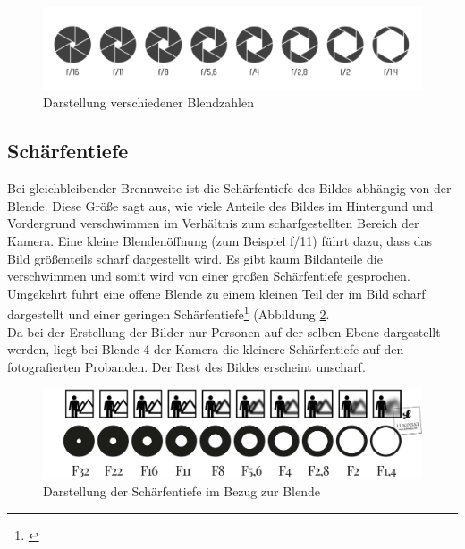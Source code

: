 \begin{figure}[htp]     %
\centering
\includegraphics[width=1.0\textwidth]{bilder/blende} 
\caption {Darstellung verschiedener Blendzahlen\protect\footnotemark}\label{b_blende}
\end{figure}


\subsection{Schärfentiefe}
\label{sec_scharf}
Bei gleichbleibender Brennweite ist die Schärfentiefe des Bildes abhängig von der Blende. Diese Größe sagt aus, wie viele Anteile des Bildes im Hintergund und Vordergrund verschwimmen im Verhältnis zum scharfgestellten Bereich der Kamera. Eine kleine Blendenöffnung (zum Beispiel f/11) führt dazu, dass das Bild größenteils scharf dargestellt wird. Es gibt kaum Bildanteile die verschwimmen und somit wird von einer großen Schärfentiefe gesprochen. Umgekehrt führt eine offene Blende zu einem kleinen Teil der im Bild scharf dargestellt und einer geringen Schärfentiefe\footnote{\cite[389]{schmidt}} (Abbildung \ref{b_scharfentiefe}.\\
Da bei der Erstellung der Bilder nur Personen auf der selben Ebene dargestellt werden, liegt bei Blende 4 der Kamera die kleinere Schärfentiefe auf den fotografierten Probanden. Der Rest des Bildes erscheint unscharf.

\begin{figure}[htp]     %
\centering
\includegraphics[width=1.0\textwidth]{bilder/scharfentiefe} 
\caption {Darstellung der Schärfentiefe im Bezug zur Blende\protect\footnotemark}\label{b_scharfentiefe}
\end{figure}

